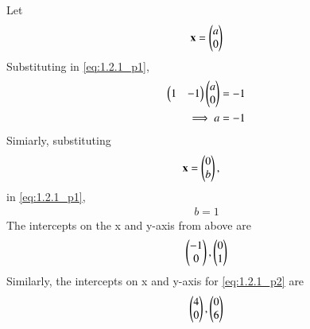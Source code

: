 %
% 
Let 
\begin{align}
\mathbf{x} = \begin{pmatrix}a\\0\end{pmatrix}
\end{align}
%
Substituting in \eqref{eq:1.2.1_p1}, 
%
\begin{align}
\begin{pmatrix}1 & -1\end{pmatrix} \begin{pmatrix}a\\0\end{pmatrix}&= -1
\\
\implies a &=-1
\end{align}
%
Simiarly, substituting 
%
\begin{align}
\mathbf{x} &= \begin{pmatrix}0\\b\end{pmatrix},
\end{align}
%
in \eqref{eq:1.2.1_p1}, 
%
%
\begin{align}
b =1
\end{align}
%
The intercepts on the x and y-axis from above are 
\begin{align}
\begin{pmatrix}-1\\0\end{pmatrix}, 
\begin{pmatrix}0\\1\end{pmatrix}
\end{align}
%
Similarly, the intercepts on x and y-axis for \eqref{eq:1.2.1_p2} are
\begin{align}
\begin{pmatrix}4\\0\end{pmatrix}, 
\begin{pmatrix}0\\6\end{pmatrix}
\end{align}

